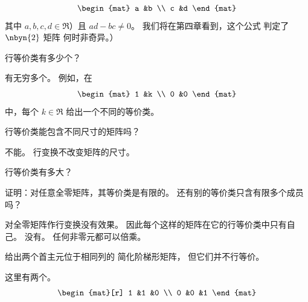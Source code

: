 \begin{exercises}
\begin{answer}
\begin{exparts}
          \begin{equation*}
            \begin{mat}
              a  &b  \\
              c  &d
            \end{mat}
          \end{equation*}
          其中 \( a,b,c,d\in\Re \)）且 \( ad-bc\neq 0 \)。
          我们将在第四章看到，这个公式 
          判定了 \( \nbyn{2} \) 矩阵
          何时非奇异。）
      \end{exparts}  
    \end{answer}
  \item 
    行等价类有多少个？
    \begin{answer}
       有无穷多个。
       例如，在 
       \begin{equation*}
         \begin{mat}
           1  &k  \\
           0  &0
         \end{mat}
       \end{equation*}
       中，每个 $k\in\Re$ 给出一个不同的等价类。  
    \end{answer}
  \item 
    行等价类能包含不同尺寸的矩阵吗？
    \begin{answer}
      不能。
      行变换不改变矩阵的尺寸。  
    \end{answer}
  \item 
    行等价类有多大？
    \begin{exparts} 
      \partsitem 证明：对任意全零矩阵，其等价类是有限的。
      \partsitem 还有别的等价类只含有限多个成员吗？
    \end{exparts}
    \begin{answer}
     \begin{exparts}
      \partsitem 对全零矩阵作行变换没有效果。
        因此每个这样的矩阵在它的行等价类中只有自己。  
      \partsitem 没有。
        任何非零元都可以倍乘。
     \end{exparts}
    \end{answer}
  \recommended \item 
    给出两个首主元位于相同列的
    简化阶梯形矩阵，
    但它们并不行等价。
    \begin{answer}
      这里有两个。
      \begin{equation*}
        \begin{mat}[r]
          1  &1  &0  \\
          0  &0  &1
        \end{mat}

\end{equation*}
\end{answer}
\end{exercises}
